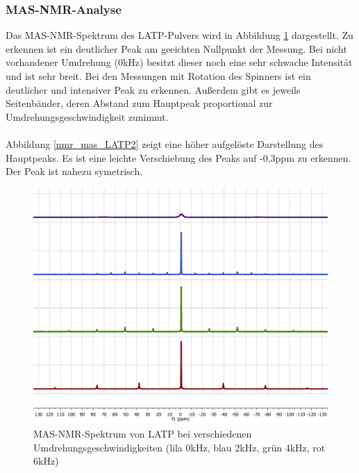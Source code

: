 \documentclass[a4paper, 11pt, headsepline,footsepline,twoside,abstract]{scrbook}
\begin{document}
\subsubsection{MAS-NMR-Analyse}
Das MAS-NMR-Spektrum des LATP-Pulvers wird in Abbildung \ref{nmr_mas_LATP} dargestellt. Zu erkennen ist ein deutlicher Peak am geeichten Nullpunkt der Messung. Bei nicht vorhandener Umdrehung (0kHz) besitzt dieser noch eine sehr schwache Intensität und ist sehr breit. Bei den Messungen mit Rotation des Spinners ist ein deutlicher und intensiver Peak zu erkennen. Außerdem gibt es jeweils Seitenbänder, deren Abstand zum Hauptpeak proportional zur Umdrehungsgeschwindigkeit zunimmt.
\\\\
Abbildung \ref{nmr_mas_LATP2} zeigt eine höher aufgelöste Darstellung des Hauptpeaks. Es ist eine leichte Verschiebung des Peaks auf -0,3ppm zu erkennen. Der Peak ist nahezu symetrisch. 
\begin{figure}
	\centering
	\includegraphics[width=1.0\columnwidth]{images/Spektrum_LATP.png}
	\caption{MAS-NMR-Spektrum von LATP bei verschiedenen Umdrehungsgeschwindigkeiten (lila 0kHz, blau 2kHz, grün 4kHz, rot 6kHz)}
	\label{nmr_mas_LATP}
\end{figure}
\end{document}
